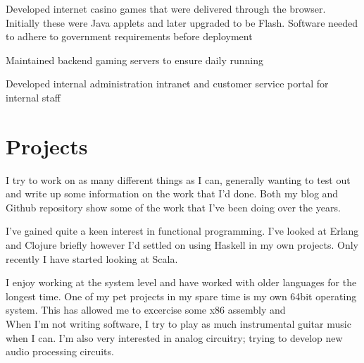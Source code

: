 \documentclass[letterpaper]{deedy-resume} %
\begin{document}
\begin{minipage}[t]{0.66\textwidth}
\sectionspace %



\begin{tightitemize}
\item Developed internet casino games that were delivered through the browser. Initially these were Java applets and later upgraded to be Flash. Software needed to adhere to government requirements before deployment
\item Maintained backend gaming servers to ensure daily running
\item Developed internal administration intranet and customer service portal for internal staff
\end{tightitemize}

\sectionspace %

\section{Projects}

I try to work on as many different things as I can, generally wanting to test out and write up some information on the work that I'd done. Both my blog and Github repository show some of the work that I've been doing over the years. \\

\vspace{5mm} 

I've gained quite a keen interest in functional programming. I've looked at Erlang and Clojure briefly however I'd settled on using Haskell in my own projects. Only recently I have started looking at Scala. \\

\vspace{5mm} 

I enjoy working at the system level and have worked with older languages for the longest time. One of my pet projects in my spare time is my own 64bit operating system. This has allowed me to excercise some x86 assembly and \\ 

When I'm not writing software, I try to play as much instrumental guitar music when I can. I'm also very interested in analog circuitry; trying to develop new audio processing circuits.

\end{minipage} %
\end{document}
